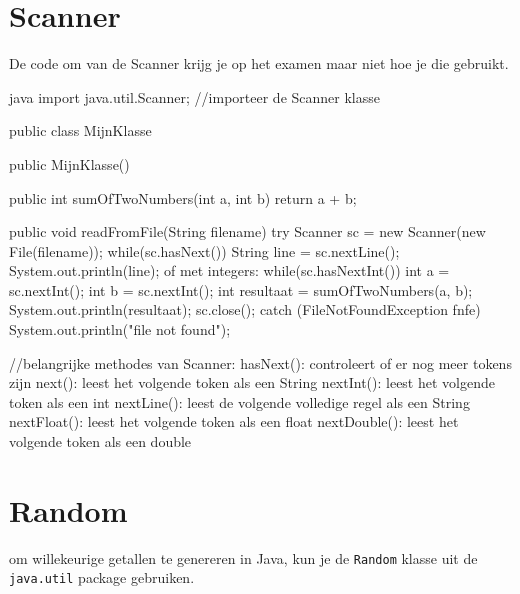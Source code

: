 \documentclass[a4paper,11pt]{article}
\begin{document}
\section{Scanner}

De code om van de Scanner krijg je op het examen maar niet hoe je die gebruikt.
\begin{codeblock}[scanner]{java}
    import java.util.Scanner; //importeer de Scanner klasse

    public class MijnKlasse 
    {
    
    public MijnKlasse() {
    }

    public int sumOfTwoNumbers(int a, int b) {
        return a + b;
    }

public void readFromFile(String filename) {
  try {
    Scanner sc = new Scanner(new File(filename));
    while(sc.hasNext()) 
    {
        String line = sc.nextLine();
        System.out.println(line);
    }
    of met integers:
    while(sc.hasNextInt())
    {
        int a = sc.nextInt();
        int b = sc.nextInt();
        int resultaat = sumOfTwoNumbers(a, b);
        System.out.println(resultaat);
    }
    sc.close();
  }
  catch (FileNotFoundException fnfe) 
  {
    System.out.println("file not found");
    }
    }
}

//belangrijke methodes van Scanner:
hasNext(): controleert of er nog meer tokens zijn
next(): leest het volgende token als een String
nextInt(): leest het volgende token als een int
nextLine(): leest de volgende volledige regel als een String
nextFloat(): leest het volgende token als een float
nextDouble(): leest het volgende token als een double
\end{codeblock}

\section{Random}

om willekeurige getallen te genereren in Java, kun je de \texttt{Random} klasse uit de \texttt{java.util} package gebruiken.
\end{document}
